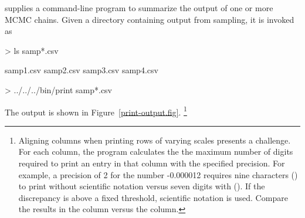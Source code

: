 \documentclass[article]{jss}
\begin{document}
 supplies a command-line program  to
summarize the output of one or more MCMC chains.  Given a directory
containing output from sampling, it is invoked as
%
\begin{CodeChunk}
\begin{CodeInput}
> ls samp*.csv
\end{CodeInput}
\begin{CodeOutput}
samp1.csv	samp2.csv	samp3.csv	samp4.csv
\end{CodeOutput}
\begin{CodeInput}
> ../../../bin/print samp*.csv
\end{CodeInput}

\end{CodeChunk}
%
The output is shown in Figure~\ref{print-output.fig}.%
%
\footnote{Aligning columns when printing rows of varying scales
  presents a challenge.  For each column, the program calculates the
  the maximum number of digits required to print an entry in that
  column with the specified precision. For example, a precision of 2
  for the number -0.000012 requires nine characters ()
  to print without scientific notation versus seven digits with
  ().  If the discrepancy is above a fixed threshold,
  scientific notation is used.  Compare the results in the 
  column versus the  column.}
%
\end{document}
